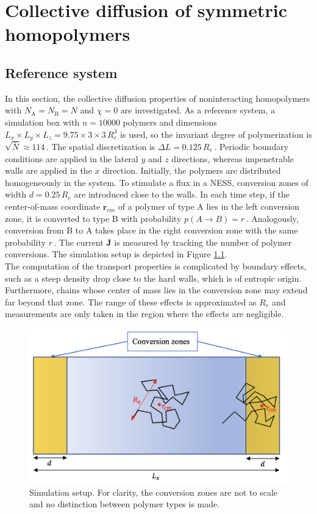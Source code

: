 \documentclass[bachelor,       %
               twoside,        %
               BCOR10mm,       %
               ngerman, english %
               ]{GAUBM}
\begin{document}
\chapter{Collective diffusion of symmetric homopolymers}
\label{chap:colldiff}

\section{Reference system}

In this section, the collective diffusion properties of noninteracting homopolymers with $N_\mathrm A=N_\mathrm B=N$ and $\chi=0$ are investigated. As a reference system, a simulation box with $n=10000$ polymers and dimensions $L_x\times L_y\times L_z=9.75\times3\times3\,R_e^3$ is used, so the invariant degree of polymerization is $\sqrt{\bar{N}}\approx 114\,$. The spatial discretization is $\Delta L=0.125\,R_e\,$.  Periodic boundary conditions are applied in the lateral $y$ and $z$ directions, whereas impenetrable walls are applied in the $x$ direction. Initially, the polymers are distributed homogeneously in the system. To stimulate a flux in a \ac{NESS}, conversion zones of width $d=0.25\,R_e$ are introduced close to the walls. In each time step, if the center-of-mass coordinate $\mathbf r_{cm}$ of a polymer of type A lies in the left conversion zone, it is converted to type B with probability $p(A\rightarrow B)=r\,$. Analogously, conversion from B to A takes place in the right conversion zone with the same probability $r\,$. The current $\mathbf J$ is measured by tracking the number of polymer conversions. The simulation setup is depicted in Figure \ref{fig:simulation_box}. \\
The computation of the transport properties is complicated by boundary effects, such as a steep density drop close to the hard walls, which is of entropic origin. Furthermore, chains whose center of mass lies in the conversion zone may extend far beyond that zone. The range of these effects is approximated as $R_e$ and measurements are only taken in the region where the effects are negligible. 


\begin{figure}[h]
  \centering
  \includegraphics[width=0.7\linewidth]{figures/simulation_box.png}
  \caption{Simulation setup. For clarity, the conversion zones are not to scale and no distinction between polymer types is made.}
  \label{fig:simulation_box}
\end{figure}
\end{document}
